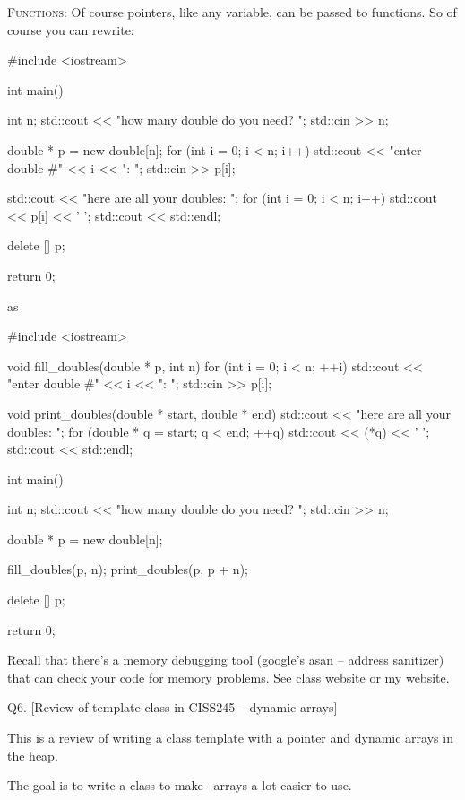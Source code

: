 \textsc{Functions:}
Of course pointers, like any variable, can be passed to functions.
So of course you can rewrite:
\begin{console}[frame=single,fontsize=\footnotesize]
#include <iostream>

int main()
{
    int n;
    std::cout << "how many double do you need? ";
    std::cin >> n;

    double * p = new double[n];
    for (int i = 0; i < n; i++)
    {
        std::cout << "enter double #" << i << ": ";
        std::cin >> p[i];
    }

    std::cout << "here are all your doubles: ";
    for (int i = 0; i < n; i++)
    {
        std::cout << p[i] << ' ';
    }
    std::cout << std::endl;

    delete [] p;

    return 0;
}
\end{console}
as
\begin{console}[frame=single,fontsize=\footnotesize]
#include <iostream>

void fill_doubles(double * p, int n)
{
    for (int i = 0; i < n; ++i)
    {
        std::cout << "enter double #" << i << ": ";
        std::cin >> p[i];
    }
}

void print_doubles(double * start, double * end)
{
    std::cout << "here are all your doubles: ";
    for (double * q = start; q < end; ++q)
    {
        std::cout << (*q) << ' ';
    }
    std::cout << std::endl;
}

int main()
{
    int n;
    std::cout << "how many double do you need? ";
    std::cin >> n;

    double * p = new double[n];

    fill_doubles(p, n);
    print_doubles(p, p + n);

    delete [] p;

    return 0;
}
\end{console}

Recall that there's a memory debugging tool (google's asan -- address sanitizer)
that can check your code for memory problems.
See class website or my website.



\newpage
Q6. [Review of template class in CISS245 -- dynamic arrays]

This is a review of writing a class template with a pointer
and dynamic arrays in the heap.

The goal is to write a class to make \cpp\ arrays a lot easier to use.

